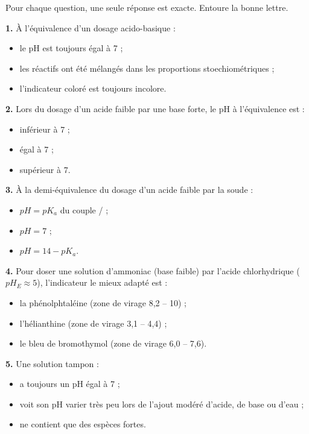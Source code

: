 \documentclass[11pt]{article}
\begin{document}
\begin{exercice}
Pour chaque question, une seule réponse est exacte. Entoure la bonne lettre.

\textbf{1.} À l'équivalence d'un dosage acido-basique :
\begin{itemize}
\item[a)] le pH est toujours égal à 7 ;
\item[b)] les réactifs ont été mélangés dans les proportions stoechiométriques ;
\item[c)] l'indicateur coloré est toujours incolore.
\end{itemize}

\textbf{2.} Lors du dosage d'un acide faible par une base forte, le pH à l'équivalence est :
\begin{itemize}
\item[a)] inférieur à 7 ; \item[b)] égal à 7 ; \item[c)] supérieur à 7.
\end{itemize}

\textbf{3.} À la demi-équivalence du dosage d'un acide faible  par la soude :
\begin{itemize}
\item[a)] $pH = pK_a$ du couple / ; \item[b)] $pH = 7$ ; \item[c)] $pH = 14 - pK_a$.
\end{itemize}

\textbf{4.} Pour doser une solution d'ammoniac (base faible) par l'acide chlorhydrique ($pH_E \approx 5$), l'indicateur le mieux adapté est :
\begin{itemize}
\item[a)] la phénolphtaléine (zone de virage 8,2 -- 10) ; \item[b)] l'hélianthine (zone de virage 3,1 -- 4,4) ; \item[c)] le bleu de bromothymol (zone de virage 6,0 -- 7,6).
\end{itemize}

\textbf{5.} Une solution tampon :
\begin{itemize}
\item[a)] a toujours un pH égal à 7 ;
\item[b)] voit son pH varier très peu lors de l'ajout modéré d'acide, de base ou d'eau ;
\item[c)] ne contient que des espèces fortes.
\end{itemize}
\end{exercice}
\end{document}
